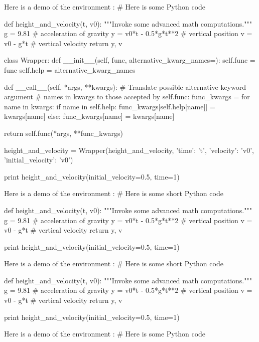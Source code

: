 
\noindent
Here is a demo of the environment :
# Here is some Python code

def height_and_velocity(t, v0):
    """Invoke some advanced math computations."""
    g = 9.81                  # acceleration of gravity
    y = v0*t - 0.5*g*t**2     # vertical position
    v = v0 - g*t              # vertical velocity
    return y, v

class Wrapper:
    def __init__(self, func, alternative_kwarg_names={}):
        self.func = func
        self.help = alternative_kwarg_names

    def __call__(self, *args, **kwargs):
        # Translate possible alternative keyword argument
        # names in kwargs to those accepted by self.func:
        func_kwargs = {}
        for name in kwargs:
            if name in self.help:
                func_kwargs[self.help[name]] = kwargs[name]
            else:
                func_kwargs[name] = kwargs[name]

        return self.func(*args, **func_kwargs)

height_and_velocity = Wrapper(height_and_velocity,
                              {'time': 't',
                               'velocity': 'v0',
                               'initial_velocity': 'v0'})

print height_and_velocity(initial_velocity=0.5, time=1)


\noindent
Here is a demo of the environment :
# Here is some short Python code

def height_and_velocity(t, v0):
    """Invoke some advanced math computations."""
    g = 9.81                  # acceleration of gravity
    y = v0*t - 0.5*g*t**2     # vertical position
    v = v0 - g*t              # vertical velocity
    return y, v

print height_and_velocity(initial_velocity=0.5, time=1)


\noindent
Here is a demo of the environment :
# Here is some short Python code

def height_and_velocity(t, v0):
    """Invoke some advanced math computations."""
    g = 9.81                  # acceleration of gravity
    y = v0*t - 0.5*g*t**2     # vertical position
    v = v0 - g*t              # vertical velocity
    return y, v

print height_and_velocity(initial_velocity=0.5, time=1)


\noindent
Here is a demo of the environment :
# Here is some Python code


